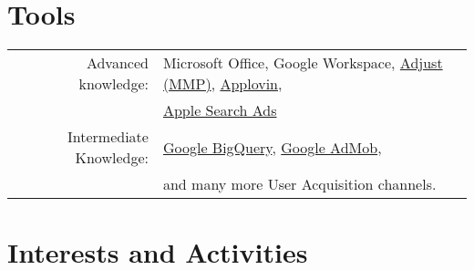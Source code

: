 \documentclass[a4paper,10pt]{article} %
\begin{document}
%
%
%

\section{Tools}

\begin{tabular}{rl}
Advanced knowledge: & Microsoft Office, Google Workspace,
    \href{https://www.adjust.com}{Adjust (MMP)},
    \href{https://www.applovin.com}{Applovin}, \\
    & \href{https://searchads.apple.com}{Apple Search Ads} \\
    Intermediate Knowledge: & \href{https://cloud.google.com/bigquery}{Google
    BigQuery},
    \href{https://admob.google.com}{Google AdMob}, \\ 
    & and many more
    User Acquisition channels.
\end{tabular}



\section{Interests and Activities}
\end{document}
